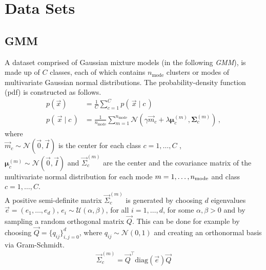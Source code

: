 \section{Data Sets}
\label{sec:datasets}

\subsection{GMM}
\label{sec:datasetgmm}
A dataset comprised of Gaussian mixture models (in the following \textit{GMM}), 
is made up of $C$ classes, 
each of which contains $n_\text{mode}$ clusters or modes of multivariate Gaussian normal distributions. 
The probability-density function (pdf) is constructed as follows.
\begin{align}
\label{eqn:gmm_distr}
    p(\vec x) &= \frac 1 C \sum_{c=1}^C p(\, \vec x \mid c \,) \nonumber\\
    p(\, \vec x \mid c \,) &= \frac 1 {n_\text{mode}} \sum _{m=1}^{n_\text{mode}}
    \mathcal N (\gamma \vec m_c + \lambda \boldsymbol \mu_c^{(m)}, \boldsymbol \Sigma_c^{(m)}) \, ,
\end{align}
where \\
$\vec m_c \sim \mathcal N (\vec 0, \vec I)$ is the center for each class $c=1,\ldots, C$ ,\\
$\boldsymbol \mu_c^{(m)} \sim \mathcal N (\vec 0, \vec I)$ and
$\vec \Sigma_c^{(m)}$ are the center and the covariance matrix of the multivariate normal distribution
for each mode $m=1,\ldots, n_{\textnormal{mode}}$ and class $c=1,\ldots, C$.  \\
A positive semi-definite matrix $\vec \Sigma_c^{(m)}$ is generated by choosing $d$ eigenvalues $\vec e = (e_1, \ldots, e_d)$, $e_i \sim \mathcal U(\alpha, \beta)$, for all $i=1, \ldots, d$, for some $\alpha, \beta > 0$ and 
by sampling a random orthogonal matrix $\vec Q$. 
This can be done for example by choosing $\vec Q = \{q_{ij}\}_{i,j=0}^{d}$, 
where $q_{ij} \sim \mathcal N(0, 1)$
and creating an orthonormal basis via Gram-Schmidt. 
\begin{align*}
    \vec \Sigma_c^{(m)} = \vec Q^\top \text{diag}(\vec e) \vec Q
\end{align*}

